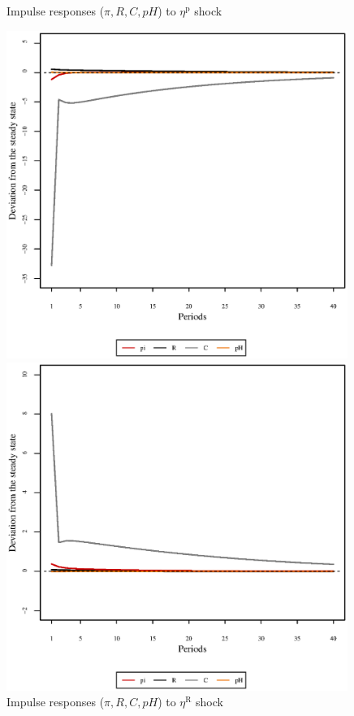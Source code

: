 \begin{figure}[h]
\begin{minipage}{0.5\textwidth}
\caption{Impulse responses ($\pi, R, C, {p\!H}$) to $\eta^{\mathrm{p}}$ shock}
\end{minipage}
\end{figure}

\begin{figure}[h]
\begin{minipage}{0.5\textwidth}
\vspace*{-3em}
\centering
\includegraphics[width=0.99\textwidth, scale=0.55]{plots/plot_33.eps}
\caption{Impulse responses ($\pi, R, C, {p\!H}$) to $\eta^{\mathrm{R}}$ shock}
\end{minipage}
\begin{minipage}{0.5\textwidth}
\vspace*{-3em}
\centering
\includegraphics[width=0.99\textwidth, scale=0.55]{plots/plot_34.eps}

\end{minipage}
\end{figure}
